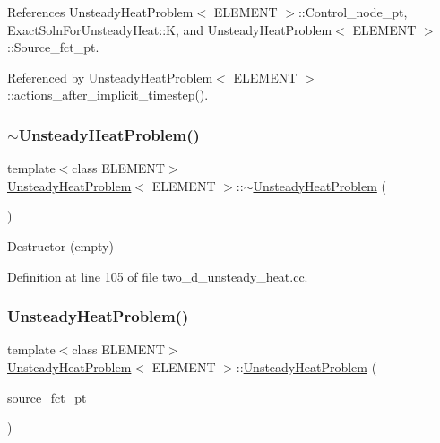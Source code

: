 References Unsteady\+Heat\+Problem$<$ E\+L\+E\+M\+E\+N\+T $>$\+::\+Control\+\_\+node\+\_\+pt, Exact\+Soln\+For\+Unsteady\+Heat\+::K, and Unsteady\+Heat\+Problem$<$ E\+L\+E\+M\+E\+N\+T $>$\+::\+Source\+\_\+fct\+\_\+pt.



Referenced by Unsteady\+Heat\+Problem$<$ E\+L\+E\+M\+E\+N\+T $>$\+::actions\+\_\+after\+\_\+implicit\+\_\+timestep().

\mbox{\label{classUnsteadyHeatProblem_acd342b40828d9e18b3571e00b3d34add}} 
\subsubsection{\texorpdfstring{$\sim$\+Unsteady\+Heat\+Problem()}{~UnsteadyHeatProblem()}\hspace{0.1cm}{\footnotesize\ttfamily [1/2]}}
{\footnotesize\ttfamily template$<$class E\+L\+E\+M\+E\+NT$>$ \\
\hyperlink{classUnsteadyHeatProblem}{Unsteady\+Heat\+Problem}$<$ E\+L\+E\+M\+E\+NT $>$\+::$\sim$\hyperlink{classUnsteadyHeatProblem}{Unsteady\+Heat\+Problem} (\begin{DoxyParamCaption}{ }\end{DoxyParamCaption})\hspace{0.3cm}{\ttfamily [inline]}}



Destructor (empty) 



Definition at line 105 of file two\+\_\+d\+\_\+unsteady\+\_\+heat.\+cc.

\mbox{\label{classUnsteadyHeatProblem_abd3a46eea132b1e5872be6a6309a51b2}} 
\subsubsection{\texorpdfstring{Unsteady\+Heat\+Problem()}{UnsteadyHeatProblem()}\hspace{0.1cm}{\footnotesize\ttfamily [2/2]}}
{\footnotesize\ttfamily template$<$class E\+L\+E\+M\+E\+NT$>$ \\
\hyperlink{classUnsteadyHeatProblem}{Unsteady\+Heat\+Problem}$<$ E\+L\+E\+M\+E\+NT $>$\+::\hyperlink{classUnsteadyHeatProblem}{Unsteady\+Heat\+Problem} (\begin{DoxyParamCaption}\item[{Unsteady\+Heat\+Equations$<$ 2 $>$\+::Unsteady\+Heat\+Source\+Fct\+Pt}]{source\+\_\+fct\+\_\+pt }\end{DoxyParamCaption})}



